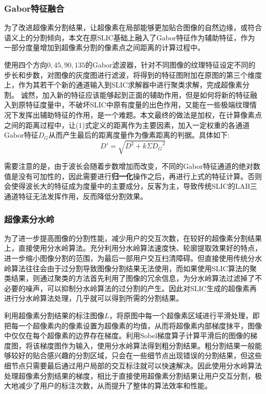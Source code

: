 \documentclass[UTF8]{ctexart}
\begin{document}
\subsubsection{Gabor特征融合}
为了改进超像素分割结果，让超像素在局部能够更加贴合图像的自然边缘，或符合语义上的分割倾向，本文在原SLIC基础上融入了Gabor特征作为辅助特征，作为一部分度量增加到超像素分割的像素点之间距离的计算过程中。

使用四个方向$0,45,90,135$的Gabor滤波器，针对不同图像的纹理特征设定不同的步长和步数，对图像的灰度图进行滤波，将得到的特征图附加在原图的第三个维度上，作为其若干个新的通道输入到SLIC求解器中进行聚类求解，完成超像素分割。
诚然，加入新的特征应该能够起到正面的辅助作用，但是如何将新的特征融入到原特征度量中，不破坏SLIC中原有度量的出色作用，又能在一些极端纹理情况下发挥出辅助特征的作用，是一个难题。本文最终的做法是加权，在计算像素点之间的距离过程中，让(1)式定义的距离作为主要因素，加入一定权重的各通道Gabor特征$D_G$从而产生最后的距离度量作为像素距离的判据。具体如下:
\begin{equation}
    D' = \sqrt{D^2 + k\Sigma{D_G}^2}
\end{equation}

需要注意的是，由于波长会随着步数增加而改变，不同的Gabor特征通道的绝对数值是没有可加性的，因此需要进行\textbf{归一化}操作之后，再进行上式的特征计算。否则会使得波长大的特征成为度量中的主要成分，反客为主，导致传统SLIC的LAB三通道特征无法发挥作用，反而降低分割效果。

\subsubsection{超像素分水岭}
为了进一步提高图像的分割性能，减少用户的交互次数，在较好的超像素分割结果上，直接使用分水岭算法。充分利用分水岭算法速度快、轮廓提取效果好的特点，进一步缩小图像分割的范围，为最后一部用户交互扫清障碍。但直接使用传统分水岭算法往往会由于过分割导致图像分割结果无法使用，而如果使用SLIC算法的聚类结果，则通过聚类的方法首先利用了图像的冗余信息，为分水岭算法过滤掉了不必要的噪声，可以抑制分水岭算法的过分割的产生。因此对SLIC生成的超像素再进行分水岭算法处理，几乎就可以得到所需的分割结果。

利用超像素分割结果的标注图像$L$，将原图中每一个超像素区域进行平滑处理，即把每一个超像素内的像素设置为超像素的均值，从而将超像素内部梯度抹平，图像中仅仅在每个超像素的边界存在梯度。利用Sobel梯度算子计算平滑后的图像的梯度图，将该梯度图作为输入，使用分水岭算法得到粗分割结果。粗分割结果一般能够较好的贴合感兴趣的分割区域，只会在一些细节点出现错误的分割结果，但这些细节点只需要最后通过用户局部的交互标注就可以快速解决。因此使用分水岭算法处理超像素分割结果的梯度，相比于直接使用超像素分割结果让用户交互分割，极大地减少了用户的标注次数，从而提升了整体的算法效率和性能。
\end{document}
